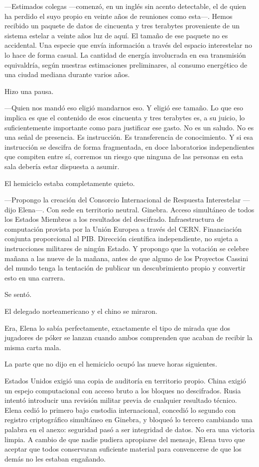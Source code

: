 \documentclass[11pt,a5paper,twoside]{book}
\begin{document}
—Estimados colegas —comenzó, en un inglés sin acento detectable, el de quien ha perdido el suyo propio en veinte años de reuniones como esta—. Hemos recibido un paquete de datos de cincuenta y tres terabytes proveniente de un sistema estelar a veinte años luz de aquí. El tamaño de ese paquete no es accidental. Una especie que envía información a través del espacio interestelar no lo hace de forma casual. La cantidad de energía involucrada en esa transmisión equivaldría, según nuestras estimaciones preliminares, al consumo energético de una ciudad mediana durante varios años.

Hizo una pausa.

—Quien nos mandó eso eligió mandarnos eso. Y eligió ese tamaño. Lo que eso implica es que el contenido de esos cincuenta y tres terabytes es, a su juicio, lo suficientemente importante como para justificar ese gasto. No es un saludo. No es una señal de presencia. Es instrucción. Es transferencia de conocimiento. Y si esa instrucción se descifra de forma fragmentada, en doce laboratorios independientes que compiten entre sí, corremos un riesgo que ninguna de las personas en esta sala debería estar dispuesta a asumir.

El hemiciclo estaba completamente quieto.

—Propongo la creación del Consorcio Internacional de Respuesta Interestelar —dijo Elena—. Con sede en territorio neutral. Ginebra. Acceso simultáneo de todos los Estados Miembros a los resultados del descifrado. Infraestructura de computación provista por la Unión Europea a través del CERN. Financiación conjunta proporcional al PIB. Dirección científica independiente, no sujeta a instrucciones militares de ningún Estado. Y propongo que la votación se celebre mañana a las nueve de la mañana, antes de que alguno de los Proyectos Cassini del mundo tenga la tentación de publicar un descubrimiento propio y convertir esto en una carrera.

Se sentó.

El delegado norteamericano y el chino se miraron.

Era, Elena lo sabía perfectamente, exactamente el tipo de mirada que dos jugadores de póker se lanzan cuando ambos comprenden que acaban de recibir la misma carta mala.

La parte que no dijo en el hemiciclo ocupó las nueve horas siguientes.

Estados Unidos exigió una copia de auditoría en territorio propio. China exigió un espejo computacional con acceso bruto a los bloques no descifrados. Rusia intentó introducir una revisión militar previa de cualquier resultado técnico. Elena cedió lo primero bajo custodia internacional, concedió lo segundo con registro criptográfico simultáneo en Ginebra, y bloqueó lo tercero cambiando una palabra en el anexo: seguridad pasó a ser integridad de datos. No era una victoria limpia. A cambio de que nadie pudiera apropiarse del mensaje, Elena tuvo que aceptar que todos conservaran suficiente material para convencerse de que los demás no les estaban engañando.
\end{document}
